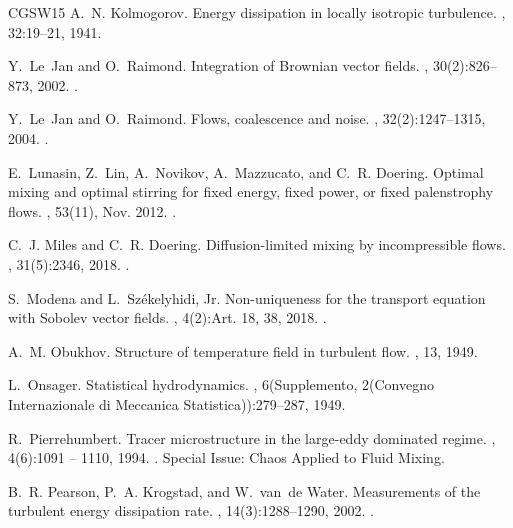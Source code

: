\documentclass[12pt]{report}   %
\numberwithin{equation}{section}
\theoremstyle{plain}
\theoremstyle{definition}
\theoremstyle{remark}
\begin{document}
\begin{thebibliography}{CGSW15}
A.~N. Kolmogorov.
\newblock Energy dissipation in locally isotropic turbulence.
, 32:19--21, 1941.

Y.~Le~Jan and O.~Raimond.
\newblock Integration of {B}rownian vector fields.
, 30(2):826--873, 2002.
\newblock {}.

Y.~Le~Jan and O.~Raimond.
\newblock Flows, coalescence and noise.
, 32(2):1247--1315, 2004.
\newblock {}.

E.~Lunasin, Z.~Lin, A.~Novikov, A.~Mazzucato, and C.~R. Doering.
\newblock Optimal mixing and optimal stirring for fixed energy, fixed power, or
  fixed palenstrophy flows.
, 53(11), Nov. 2012.
\newblock {}.

C.~J. Miles and C.~R. Doering.
\newblock Diffusion-limited mixing by incompressible flows.
, 31(5):2346, 2018.
\newblock {}.

S.~Modena and L.~Sz\'{e}kelyhidi, Jr.
\newblock Non-uniqueness for the transport equation with {S}obolev vector
  fields.
, 4(2):Art. 18, 38, 2018.
\newblock {}.

A.~M. Obukhov.
\newblock Structure of temperature field in turbulent flow.
, 13, 1949.

L.~Onsager.
\newblock Statistical hydrodynamics.
, 6(Supplemento, 2(Convegno Internazionale di
  Meccanica Statistica)):279--287, 1949.

R.~Pierrehumbert.
\newblock Tracer microstructure in the large-eddy dominated regime.
, 4(6):1091 -- 1110, 1994.
\newblock {}.
\newblock Special Issue: Chaos Applied to Fluid Mixing.

B.~R. Pearson, P.~A. Krogstad, and W.~van~de Water.
\newblock Measurements of the turbulent energy dissipation rate.
, 14(3):1288--1290, 2002.
\newblock {}.


\end{thebibliography}
\end{document}
